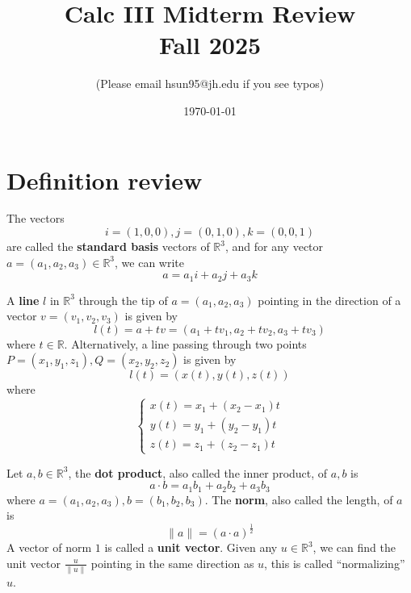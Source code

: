 \documentclass[openany]{book}
\title{Calc III Midterm Review
\\ 
\vspace{0.4cm}
\large Fall 2025}
\author{(Please email hsun95@jh.edu if you see typos)}
\date{\today}
\newcommand{\R}{\mathbb{R}}
\begin{document}
\maketitle

\tableofcontents
\newpage


\chapter{Definition review}



\begin{defn}[standard basis in $\R^3$]
    The vectors 
    \begin{equation*}
        i=(1,0,0), j=(0,1,0), k=(0,0,1)
    \end{equation*}
    are called the \textbf{standard basis} vectors of $\R^3$, and for any vector $a=(a_1,a_2,a_3)\in\R^3$, we can write 
    \begin{equation*}
        a=a_1i+a_2j+a_3k
    \end{equation*}
\end{defn}



\begin{defn}\label{line}
    A \textbf{line} $l$ in $\R^3$ through the tip of $a=(a_1,a_2,a_3)$ pointing in the direction of a vector $v=(v_1,v_2,v_3)$ is given by 
    \begin{equation*}
        l(t)=a+tv=(a_1+tv_1, a_2+tv_2, a_3+tv_3)
    \end{equation*}
    where $t\in\R$. Alternatively, a line passing through two points $P=(x_1,y_1,z_1), Q=(x_2,y_2,z_2)$ is given by 
    \begin{equation*}
        l(t)=(x(t), y(t), z(t))
    \end{equation*}
    where 
    \begin{equation*}
        \begin{cases}
            x(t)=x_1+(x_2-x_1)t\\
            y(t)=y_1+(y_2-y_1)t\\
            z(t)=z_1+(z_2-z_1)t
        \end{cases}
    \end{equation*}
\end{defn}



\begin{defn}
    Let $a,b\in\R^3$, the \textbf{dot product}, also called the inner product, of $a,b$ is 
    \begin{equation*}
        a\cdot b=a_1b_1+a_2b_2+a_3b_3
    \end{equation*}
    where $a=(a_1,a_2,a_3), b=(b_1,b_2,b_3)$. The \textbf{norm}, also called the length, of $a$ is 
    \begin{equation*}
        \|a\|=(a\cdot a)^\frac{1}{2}
    \end{equation*}
    A vector of norm $1$ is called a \textbf{unit vector}. Given any $u\in\R^3$, we can find the unit vector $\frac{u}{\|u\|}$ pointing in the same direction as $u$, this is called ``normalizing'' $u$.
\end{defn}
\end{document}
